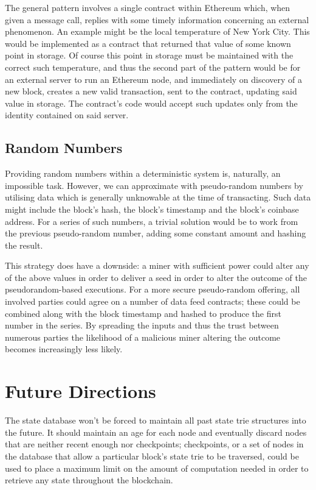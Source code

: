\documentclass[9pt,oneside]{amsart}
\begin{document}
\begin{multicols}{2}
The general pattern involves a single contract within Ethereum which, when given a message call, replies with some timely information concerning an external phenomenon. An example might be the local temperature of New York City. This would be implemented as a contract that returned that value of some known point in storage. Of course this point in storage must be maintained with the correct such temperature, and thus the second part of the pattern would be for an external server to run an Ethereum node, and immediately on discovery of a new block, creates a new valid transaction, sent to the contract, updating said value in storage. The contract's code would accept such updates only from the identity contained on said server.

\subsection{Random Numbers}
Providing random numbers within a deterministic system is, naturally, an impossible task. However, we can approximate with pseudo-random numbers by utilising data which is generally unknowable at the time of transacting. Such data might include the block's hash, the block's timestamp and the block's coinbase address. For a series of such numbers, a trivial solution would be to work from the previous pseudo-random number, adding some constant amount and hashing the result.

This strategy does have a downside: a miner with sufficient power could alter any of the above values in order to deliver a seed in order to alter the outcome of the pseudorandom-based executions. For a more secure pseudo-random offering, all involved parties could agree on a number of data feed contracts; these could be combined along with the block timestamp and hashed to produce the first number in the series. By spreading the inputs and thus the trust between numerous parties the likelihood of a malicious miner altering the outcome becomes increasingly less likely.

\section{Future Directions} \label{ch:future}

The state database won't be forced to maintain all past state trie structures into the future. It should maintain an age for each node and eventually discard nodes that are neither recent enough nor checkpoints; checkpoints, or a set of nodes in the database that allow a particular block's state trie to be traversed, could be used to place a maximum limit on the amount of computation needed in order to retrieve any state throughout the blockchain.


\end{multicols}
\end{document}
